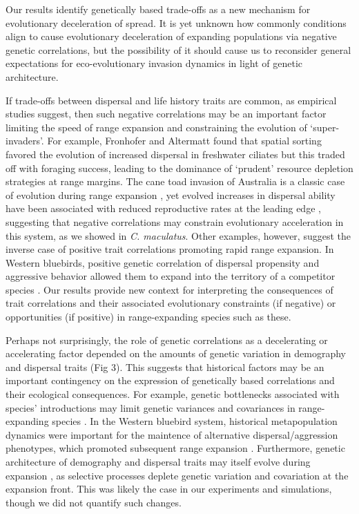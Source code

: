 \documentclass[11pt]{article}
\begin{document}
Our results identify genetically based trade-offs as a new mechanism for evolutionary deceleration of spread.
It is yet unknown how commonly conditions align to cause evolutionary deceleration of expanding populations via negative genetic correlations, but the possibility of it should cause us to reconsider general expectations for eco-evolutionary invasion dynamics in light of genetic architecture.

If trade-offs between dispersal and life history traits are common, as empirical studies suggest, then such negative correlations may be an important factor limiting the speed of range expansion and constraining the evolution of `super-invaders'.
For example, Fronhofer and Altermatt \citeyearpar{fronhofer_eco-evolutionary_2015} found that spatial sorting favored the evolution of increased dispersal in freshwater ciliates but this traded off with foraging success, leading to the dominance of `prudent' resource depletion strategies at range margins.
The cane toad invasion of Australia is a classic case of evolution during range expansion \citep{phillips_invasion_2006}, yet evolved increases in dispersal ability have been associated with reduced reproductive rates at the leading edge \citep{hudson_virgins_2015}, suggesting that negative correlations may constrain evolutionary acceleration in this system, as we showed in \textit{C. maculatus}.
Other examples, however, suggest the inverse case of positive trait correlations promoting rapid range expansion.
In Western bluebirds, positive genetic correlation of dispersal propensity and aggressive behavior allowed them to expand into the territory of a competitor species \citep{duckworth_coupling_2007,duckworth2009evolution}.
Our results provide new context for interpreting the consequences of trait correlations and their associated evolutionary constraints (if negative) or opportunities (if positive) in range-expanding species such as these.


Perhaps not surprisingly, the role of genetic correlations as a decelerating or accelerating factor depended on the amounts of genetic variation in demography and dispersal traits (Fig 3).
This suggests that historical factors may be an important contingency on the expression of genetically based correlations and their ecological consequences.
For example, genetic bottlenecks associated with species' introductions may limit genetic variances and covariances in range-expanding species \citep{dlugosch2008founding,wagner2017genetic}.
In the Western bluebird system, historical metapopulation dynamics were important for the maintence of alternative dispersal/aggression phenotypes, which promoted subsequent range expansion \citep{duckworth2008adaptive}.
Furthermore, genetic architecture of demography and dispersal traits may itself evolve during expansion \citep{arnold2008understanding}, as selective processes deplete genetic variation and covariation at the expansion front.
This was likely the case in our experiments and simulations, though we did not quantify such changes.
\end{document}
